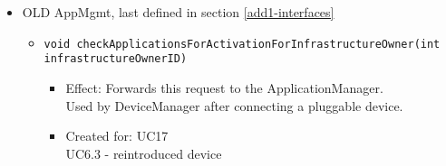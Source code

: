 {{{\begin{itemize}
\begin{itemize}
\begin{itemize}
                              Adds a new pluggable device to the topology of the infrastructure owner and links it to a mote. The device gets the mote's location by default. If the device is already linked to another mote, overwrites that link. \\
                              Notifies the infrastructure owner that owns the gateway that the pluggable device was detected.
                        \item Created for: UC6.3, U2 - easy pluggable device installation
                    \end{itemize}
                \item \texttt{void reactivateDevice(PluggableDeviceID id)}
                    \begin{itemize}
                        \item Effect: Changes the status of a pluggable device to 'active'. \\
                              Changes the status of a pluggable device in the topology to 'placed'. \\
                              Notifies the infrastructure owner that owns the gateway that the pluggable device was detected and reactivated.
                        \item Created for: UC6.3 - reintroduced device
                    \end{itemize}
                \item \texttt{Map<string, string> getConfigDB(PluggableDeviceID pID)}
                    \begin{itemize}
                        \item Effect: Gets the last set configurations of a pluggable device from the DeviceDB.
                        \item Created for: UC6.3 - reintroduced device
                    \end{itemize}
            \end{itemize}

            \item OLD AppMgmt, last defined in section \ref{add1-interfaces}
                \begin{itemize}
                    \item \texttt{void checkApplicationsForActivationForInfrastructureOwner(int infrastructureOwnerID)}
                        \begin{itemize}
                			\item Effect: Forwards this request to the ApplicationManager. \\
                                  Used by DeviceManager after connecting a pluggable device.
                			\item Created for: UC17 \\  UC6.3 - reintroduced device
                        \end{itemize}
                \end{itemize}
        \end{itemize}

}}}

